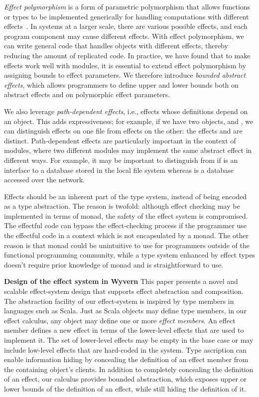 \textit{Effect polymorphism} is a form of parametric polymorphism that allows functions or types to be implemented generically for handling computations with different effects~\cite{lucassen88}. In systems at a larger scale, there are various possible effects, and each program component may cause different effects. With effect polymorphism, we can write general code that handles objects with different effects, thereby reducing the amount of replicated code. In practice, we have found that to make effects work well with modules, it is essential to extend effect polymorphism by assigning bounds to effect parameters. We therefore introduce \textit{bounded abstract effects}, which allows programmers to define upper and lower bounds both on abstract effects and on polymorphic effect parameters.


We also leverage \textit{path-dependent effects}, i.e., effects whose definitions depend on an object. This adds expressiveness; for example, if we have two  objects,  and , we can distinguish effects on one file from effects on the other: the effects  and  are distinct.  Path-dependent effects are particularly important in the context of modules, where two different modules may implement the same abstract effect in different ways.  For example, it may be important to distinguish  from  if  is an interface to a database stored in the local file system whereas  is a database accessed over the network.

Effects should be an inherent part of the type system, instead of being encoded as a type abstraction. The reason is twofold: although effect checking may be implemented in terms of monad, the safety of the effect system is compromised. The effectful code can bypass the effect-checking process if the programmer use the effectful code in a context which is not encapsulated by a monad. The other reason is that monad could be unintuitive to use for programmers outside of the functional programming community, while a type system enhanced by effect types doesn't require prior knowledge of  monad and is straightforward to use.

\noindent\textbf{Design of the effect system in Wyvern}
This paper presents a novel and scalable effect-system design that supports effect abstraction and composition. The abstraction facility of our effect-system is inspired by type members in languages such as Scala. Just as Scala objects may define type members, in our effect calculus, any object may define one or more \textit{effect members}.  An effect member defines a new effect in terms of the lower-level effects that are used to implement it.  The set of lower-level effects may be empty in the base case or may include low-level effects that are hard-coded in the system.  Type ascription can enable information hiding by concealing the definition of an effect member from the containing object's clients. In addition to completely concealing the definition of an effect, our calculus provides bounded abstraction, which exposes upper or lower bounds of the definition of an effect, while still hiding the definition of it. 





